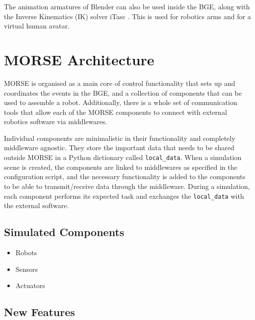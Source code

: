 \documentclass{llncs}
\begin{document}
The animation armatures of Blender can also be used inside the BGE, along with
the Inverse Kinematics (IK) solver iTasc \cite{iTaSC}. This is used for
robotics arms and for a virtual human avatar.

\section{MORSE Architecture}
\label{section:architecture}

MORSE is organised as a main core of control functionality that sets up and
coordinates the events in the BGE, and a collection of components that can be
used to assemble a robot. Additionally, there is a whole set of communication
tools that allow each of the MORSE components to connect with external robotics
software via middlewares.

Individual components are minimalistic in their functionality and  completely
middleware agnostic. They store the important data that needs to be shared
outside MORSE in a Python dictionary called \texttt{local\_data}.  When a
simulation scene is created, the components are linked to middlewares as
specified in the configuration script, and the necessary functionality is added
to the components to be able to transmit/receive data through the middleware.
During a simulation, each component performs its expected task and exchanges
the \texttt{local\_data} with the external software.

\subsection{Simulated Components}
\label{section:components}

\begin{itemize}
  \item Robots
  \item Sensors
  \item Actuators
\end{itemize}

\subsection{New Features}
\end{document}
